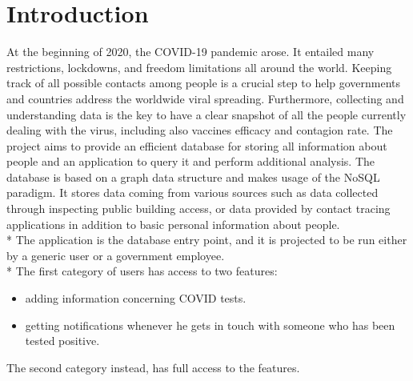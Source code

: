 \section{Introduction}
At the beginning of 2020, the COVID-19 pandemic arose. It entailed many restrictions, lockdowns, and freedom limitations all around the world.
Keeping track of all possible contacts among people is a crucial step to help governments and countries address the worldwide viral spreading.
Furthermore, collecting and understanding data is the key to have a clear snapshot of all the people currently dealing with the virus, including also vaccines efficacy and contagion rate.
The project aims to provide an efficient database for storing all information about people and an application to query it and perform additional analysis.
The database is based on a graph data structure and makes usage of the NoSQL paradigm.
It stores data coming from various sources such as data collected through inspecting public building access, or data provided by contact tracing applications in addition to basic personal information about people.
\\* The application is the database entry point, and it is projected to be run either by a generic user or a government employee.
\\* The first category of users has access to two features:
\begin{itemize}
    \item adding information concerning COVID tests.
    \item getting notifications whenever he gets in touch with someone who has been tested positive.
\end{itemize}
The second category instead, has full access to the features.